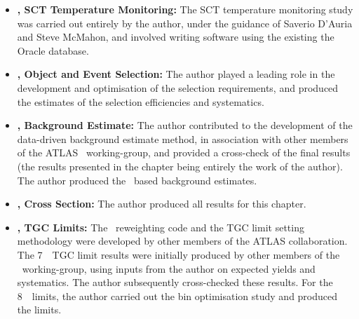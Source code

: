 \begin{itemize}

\item {\bf {}, SCT Temperature Monitoring:} The SCT temperature
monitoring study was carried out entirely by the author, under the guidance of
Saverio D'Auria and Steve McMahon, and involved writing software using
the existing the Oracle database. 

\item {\bf {}, Object and Event Selection:} The author played a
leading role in the development and optimisation of the selection requirements,
and produced the estimates of the selection efficiencies and systematics.

\item {\bf {}, Background Estimate:} The author contributed to the 
development of the data-driven background estimate method, in association with other members
of the ATLAS \ZZ\ working-group, and provided a cross-check of the final
results (the results presented in the chapter being entirely the work of the
author). The author produced the \mc\ based background estimates.

\item {\bf {}, Cross Section:} The author produced all results for
this chapter.

\item {\bf {}, TGC Limits:} The \AfterBurner\ reweighting code and the TGC
limit setting methodology were developed by other members of the ATLAS
collaboration.
The 7~\tev\ TGC limit results were initially produced by
other members of the \ZZ\ working-group, using inputs from the author on expected
yields and systematics. The author subsequently cross-checked these results. For
the 8~\tev\ limits, the author carried out the bin optimisation study and
produced the limits.

\end{itemize}
